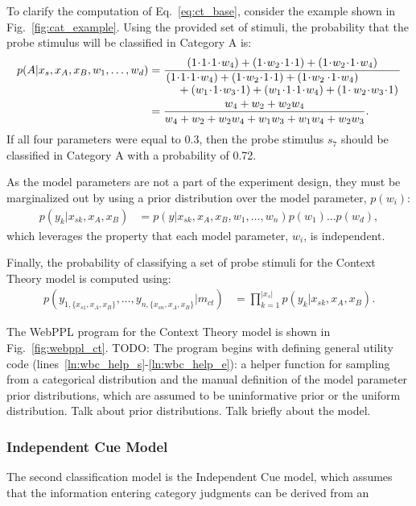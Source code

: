 \documentclass[11pt]{article}
\begin{document}
To clarify the computation of Eq.~\ref{eq:ct_base}, consider the example shown in Fig.~\ref{fig:cat_example}. Using the provided set of stimuli, the probability that the probe stimulus will be classified in Category A is: 
\begin{align}
    p(A | x_s, x_A, x_B, w_1, \dots, w_d) 
        &= \frac{(1\!\cdot\!1\!\cdot\!1\!\cdot\!w_4) + (1\!\cdot\!w_2\!\cdot\!1\!\cdot\!1) + (1\!\cdot\!w_2\!\cdot\!1\!\cdot\!w_4)}{ \splitfrac{(1\!\cdot\!1\!\cdot\!1\!\cdot\!w_4) + (1\!\cdot\!w_2\!\cdot\!1\!\cdot\!1) + (1\!\cdot\!w_2 \cdot\!1\!\cdot\!w_4)}{+ (w_1\!\cdot\!1\!\cdot\!w_3\!\cdot\!1) + (w_1\!\cdot\!1\!\cdot\!1\!\cdot\!w_4) + (1\!\cdot w_2\!\cdot\!w_3\!\cdot\!1)}} \notag \\
        &= \frac{w_4 + w_2 + w_2w_4}{w_4 + w_2 + w_2w_4 + w_1w_3 + w_1w_4 + w_2w_3}. 
\end{align}
If all four parameters were equal to 0.3, then the probe stimulus $s_7$ should be classified in Category A with a probability of 0.72. 

As the model parameters are not a part of the experiment design, they must be marginalized out by using a prior distribution over the model parameter, $p(w_i)$:
\begin{align}
    p(y_k | x_{sk}, x_A, x_B) &=  p(y|x_{sk}, x_A, x_B ,w_1, \dots, w_n) p(w_1) \dots p(w_d),
\end{align}
which leverages the property that each model parameter, $w_i$, is independent.

Finally, the probability of classifying a set of probe stimuli for the Context Theory model is computed using: 
\begin{align}
    p(y_{1,\{x_{s1}, x_A, x_B\}}, \dots, y_{n,\{x_{sn}, x_A, x_B\}} | m_{ct}) &=  \prod\limits_{k=1}^{|x_s|} p(y_k|x_{sk}, x_A, x_B).
\end{align}

The WebPPL program for the Context Theory model is shown in Fig.~\ref{fig:webppl_ct}. TODO: The program begins with defining general utility code (lines~\ref{ln:wbc_help_s}-\ref{ln:wbc_help_e}): a helper function for sampling from a categorical distribution and the manual definition of the model parameter prior distributions, which are assumed to be uninformative prior or the uniform distribution. Talk about prior distributions. Talk briefly about the model. 


\subsubsection{Independent Cue Model}
The second classification model is the Independent Cue model, which assumes that the information entering category judgments can be derived from an 
\end{document}
